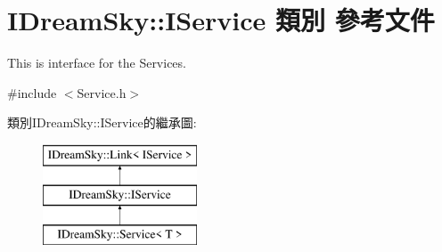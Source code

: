 \hypertarget{class_i_dream_sky_1_1_i_service}{}\section{I\+Dream\+Sky\+:\+:I\+Service 類別 參考文件}
\label{class_i_dream_sky_1_1_i_service}


This is interface for the Services.  




{\ttfamily \#include $<$Service.\+h$>$}

類別\+I\+Dream\+Sky\+:\+:I\+Service的繼承圖\+:\begin{figure}[H]
\begin{center}
\leavevmode
\includegraphics[height=3.000000cm]{class_i_dream_sky_1_1_i_service}
\end{center}
\end{figure}
